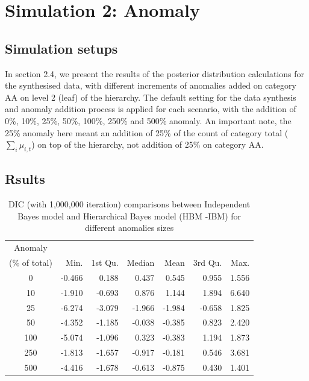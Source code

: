 
\section{Simulation 2: Anomaly}

\subsection{Simulation setups}

In section 2.4, we present the results of the posterior distribution calculations for the synthesised data, with different increments of anomalies added on category AA on level 2 (leaf) of the hierarchy. The default setting for the data synthesis and anomaly addition process is applied for each scenario, with the addition of 0\%, 10\%, 25\%, 50\%, 100\%, 250\% and 500\% anomaly. An important note, the 25\% anomaly here meant an addition of 25\% of the count of category total ($\sum_i \mu_{i,t}$) on top of the hierarchy, not addition of 25\% on category AA.  

\subsection{Rsults}
\begin{table}[ht]
	\centering
	\begin{tabular}{crrrrrr}
		\hline
		Anomaly &&&&&&\\
		(\% of total) & Min. & 1st Qu. & Median & Mean & 3rd Qu. & Max. \\ 
		\hline
		0 & -0.466 & 0.188 & 0.437 & 0.545 & 0.955 & 1.556 \\ 
		10 & -1.910 & -0.693 & 0.876 & 1.144 & 1.894 & 6.640 \\ 
		25 & -6.274 & -3.079 & -1.966 & -1.984 & -0.658 & 1.825 \\ 
		50 & -4.352 & -1.185 & -0.038 & -0.385 & 0.823 & 2.420 \\ 
		100 & -5.074 & -1.096 & 0.323 & -0.383 & 1.194 & 1.873 \\ 
		250 & -1.813 & -1.657 & -0.917 & -0.181 & 0.546 & 3.681 \\ 
		500 & -4.416 & -1.678 & -0.613 & -0.875 & 0.430 & 1.401 \\ 
		\hline
	\end{tabular}
	\caption{DIC (with 1,000,000 iteration) comparisons between Independent Bayes model and Hierarchical Bayes model (HBM -IBM) for different anomalies sizes} 
	\label{tab:dicanomaly}
\end{table}

